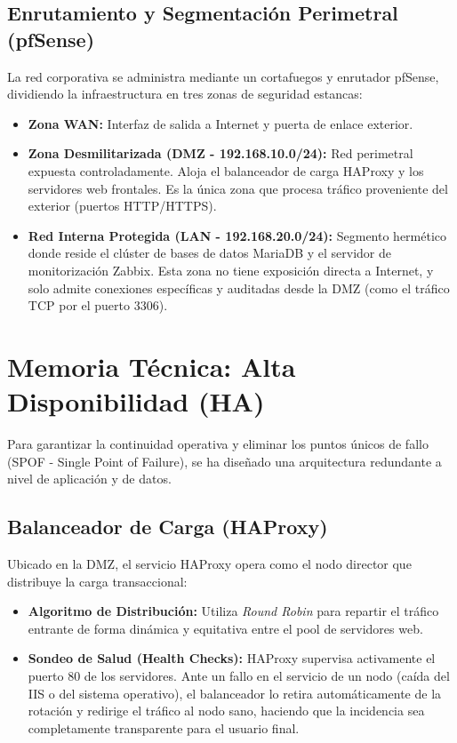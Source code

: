 \documentclass[12pt,a4paper]{article}
\begin{document}
\subsection{Enrutamiento y Segmentación Perimetral (pfSense)}
La red corporativa se administra mediante un cortafuegos y enrutador pfSense, dividiendo la infraestructura en tres zonas de seguridad estancas:
\begin{itemize}
    \item \textbf{Zona WAN:} Interfaz de salida a Internet y puerta de enlace exterior.
    \item \textbf{Zona Desmilitarizada (DMZ - 192.168.10.0/24):} Red perimetral expuesta controladamente. Aloja el balanceador de carga HAProxy y los servidores web frontales. Es la única zona que procesa tráfico proveniente del exterior (puertos HTTP/HTTPS).
    \item \textbf{Red Interna Protegida (LAN - 192.168.20.0/24):} Segmento hermético donde reside el clúster de bases de datos MariaDB y el servidor de monitorización Zabbix. Esta zona no tiene exposición directa a Internet, y solo admite conexiones específicas y auditadas desde la DMZ (como el tráfico TCP por el puerto 3306).
\end{itemize}

\section{Memoria Técnica: Alta Disponibilidad (HA)}
\label{sec:AltaDisponibilidad}
Para garantizar la continuidad operativa y eliminar los puntos únicos de fallo (SPOF - Single Point of Failure), se ha diseñado una arquitectura redundante a nivel de aplicación y de datos.

\subsection{Balanceador de Carga (HAProxy)}
Ubicado en la DMZ, el servicio HAProxy opera como el nodo director que distribuye la carga transaccional:
\begin{itemize}
    \item \textbf{Algoritmo de Distribución:} Utiliza \textit{Round Robin} para repartir el tráfico entrante de forma dinámica y equitativa entre el pool de servidores web.
    \item \textbf{Sondeo de Salud (Health Checks):} HAProxy supervisa activamente el puerto 80 de los servidores. Ante un fallo en el servicio de un nodo (caída del IIS o del sistema operativo), el balanceador lo retira automáticamente de la rotación y redirige el tráfico al nodo sano, haciendo que la incidencia sea completamente transparente para el usuario final.
\end{itemize}
\end{document}

